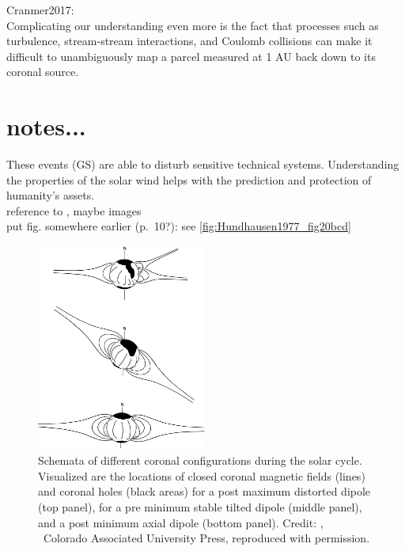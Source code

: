 Cranmer2017:\\
Complicating our understanding even more is the fact that processes such as turbulence, stream-stream interactions, and Coulomb collisions can make it difficult to unambiguously map a parcel measured at 1 AU back down to its coronal source.\\


\section{notes...}

These events (GS) are able to disturb sensitive technical systems. Understanding the properties of the solar wind helps with the prediction and protection of humanity's assets.\\

reference to \citet{Bothmer2007}, maybe images\\

put fig. somewhere earlier (p.~10?): see \autoref{fig:Hundhausen1977_fig20bcd}\\
\begin{figure}[htb]
	\centering
	\includegraphics[width=0.5\textwidth]{figures_of_others/images/Hundhausen1977_fig20bcd.png}
	\caption[Credit: {\citep[Fig.~20, panels (b--d)]{Hundhausen1977}}, \textcopyright~Colorado Associated University Press, reproduced with permission.]
	{Schemata of different coronal configurations during the solar cycle. Visualized are the locations of closed coronal magnetic fields (lines) and coronal holes (black areas) for a post maximum distorted dipole (top panel), for a pre minimum stable tilted dipole (middle panel), and a post minimum axial dipole (bottom panel). Credit: {\citep[Fig.~20, panels (b--d)]{Hundhausen1977}}, \textcopyright~Colorado Associated University Press, reproduced with permission.}
	\label{fig:Hundhausen1977_fig20bcd}
\end{figure}


